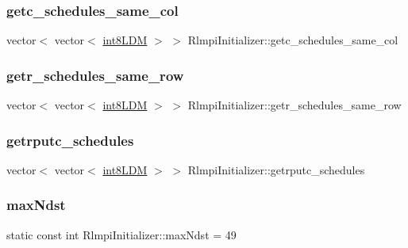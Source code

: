 \subsubsection{\texorpdfstring{getc\_schedules\_same\_col}{getc\_schedules\_same\_col}}
{\footnotesize\ttfamily vector$<$ vector$<$ \mbox{\hyperlink{include_2RlmpiShared_8h_a69782ffde89d45e86308f10afedf08a6}{int8\+L\+DM}} $>$ $>$ Rlmpi\+Initializer\+::getc\+\_\+schedules\+\_\+same\+\_\+col}

\mbox{\label{classRlmpiInitializer_abc07b9a75ce962623dc3963f9ee7fcc9}} 
\subsubsection{\texorpdfstring{getr\_schedules\_same\_row}{getr\_schedules\_same\_row}}
{\footnotesize\ttfamily vector$<$ vector$<$ \mbox{\hyperlink{include_2RlmpiShared_8h_a69782ffde89d45e86308f10afedf08a6}{int8\+L\+DM}} $>$ $>$ Rlmpi\+Initializer\+::getr\+\_\+schedules\+\_\+same\+\_\+row}

\mbox{\label{classRlmpiInitializer_a0363a64d44e61840473b741f25001153}} 
\subsubsection{\texorpdfstring{getrputc\_schedules}{getrputc\_schedules}}
{\footnotesize\ttfamily vector$<$ vector$<$ \mbox{\hyperlink{include_2RlmpiShared_8h_a69782ffde89d45e86308f10afedf08a6}{int8\+L\+DM}} $>$ $>$ Rlmpi\+Initializer\+::getrputc\+\_\+schedules}

\mbox{\label{classRlmpiInitializer_aa4d2d2f2a7ae035c643764931e3051dd}} 
\subsubsection{\texorpdfstring{maxNdst}{maxNdst}}
{\footnotesize\ttfamily static const int Rlmpi\+Initializer\+::max\+Ndst = 49\hspace{0.3cm}{\ttfamily [static]}}

